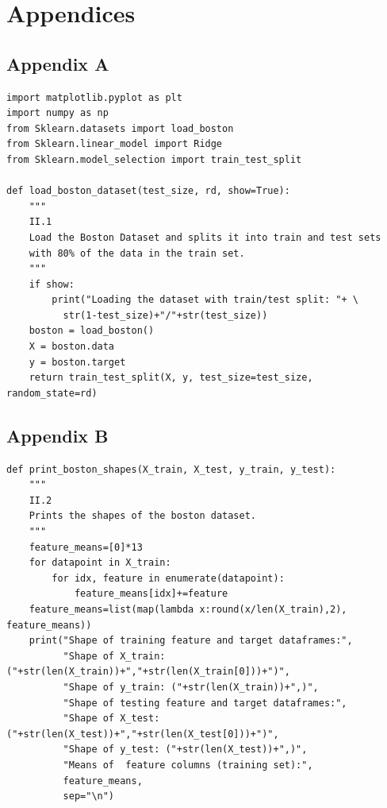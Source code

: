 \documentclass{homework}
\begin{document}
\printbibliography

\clearpage
\section*{Appendices}
\subsection*{Appendix A}
\lstset{language=Python}
\lstset{frame=lines}
\lstset{basicstyle=\footnotesize}
\begin{lstlisting}
import matplotlib.pyplot as plt
import numpy as np
from Sklearn.datasets import load_boston
from Sklearn.linear_model import Ridge
from Sklearn.model_selection import train_test_split

def load_boston_dataset(test_size, rd, show=True):
    """
    II.1
    Load the Boston Dataset and splits it into train and test sets
    with 80% of the data in the train set.
    """
    if show:
        print("Loading the dataset with train/test split: "+ \
          str(1-test_size)+"/"+str(test_size))
    boston = load_boston()
    X = boston.data
    y = boston.target
    return train_test_split(X, y, test_size=test_size, random_state=rd)
\end{lstlisting}

\subsection*{Appendix B}
\lstset{language=Python}
\lstset{frame=lines}
\lstset{basicstyle=\footnotesize}
\begin{lstlisting}
def print_boston_shapes(X_train, X_test, y_train, y_test):
    """
    II.2
    Prints the shapes of the boston dataset.
    """
    feature_means=[0]*13
    for datapoint in X_train:
        for idx, feature in enumerate(datapoint):
            feature_means[idx]+=feature
    feature_means=list(map(lambda x:round(x/len(X_train),2), feature_means))
    print("Shape of training feature and target dataframes:",
          "Shape of X_train: ("+str(len(X_train))+","+str(len(X_train[0]))+")",
          "Shape of y_train: ("+str(len(X_train))+",)",
          "Shape of testing feature and target dataframes:",
          "Shape of X_test: ("+str(len(X_test))+","+str(len(X_test[0]))+")",
          "Shape of y_test: ("+str(len(X_test))+",)",
          "Means of  feature columns (training set):",
          feature_means,
          sep="\n")
\end{lstlisting}
\end{document}
